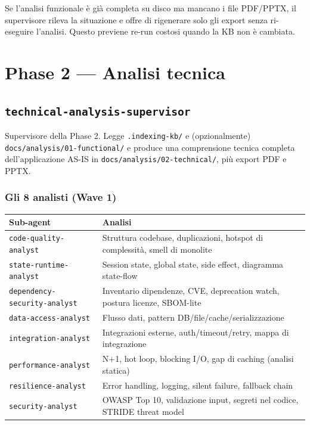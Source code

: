 \documentclass[12pt,a4paper,twoside]{book}
\begin{document}
Se l'analisi funzionale è già completa su disco ma mancano i file PDF/PPTX, il supervisore rileva la situazione e offre di rigenerare solo gli export senza ri-eseguire l'analisi. Questo previene re-run costosi quando la KB non è cambiata.

\chapter{Phase 2 — Analisi tecnica}

\section{\texttt{technical-analysis-supervisor}}

Supervisore della Phase 2. Legge \texttt{.indexing-kb/} e (opzionalmente) \texttt{docs/analysis/01-functional/} e produce una comprensione tecnica completa dell'applicazione AS-IS in \texttt{docs/analysis/02-technical/}, più export PDF e PPTX.

\subsection{Gli 8 analisti (Wave 1)}

\begin{center}
\begin{longtable}{lp{9cm}}
\toprule
\textbf{Sub-agent} & \textbf{Analisi} \\
\midrule
\endhead
\texttt{code-quality-analyst} & Struttura codebase, duplicazioni, hotspot di complessità, smell di monolite \\
\texttt{state-runtime-analyst} & Session state, global state, side effect, diagramma state-flow \\
\texttt{dependency-security-analyst} & Inventario dipendenze, CVE, deprecation watch, postura licenze, SBOM-lite \\
\texttt{data-access-analyst} & Flusso dati, pattern DB/file/cache/serializzazione \\
\texttt{integration-analyst} & Integrazioni esterne, auth/timeout/retry, mappa di integrazione \\
\texttt{performance-analyst} & N+1, hot loop, blocking I/O, gap di caching (analisi statica) \\
\texttt{resilience-analyst} & Error handling, logging, silent failure, fallback chain \\
\texttt{security-analyst} & OWASP Top 10, validazione input, segreti nel codice, STRIDE threat model \\
\bottomrule
\end{longtable}
\end{center}
\end{document}

